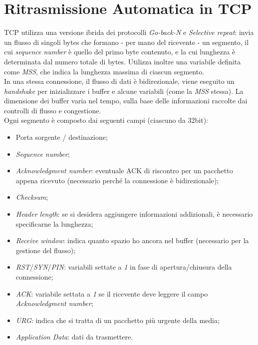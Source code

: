 \section{Ritrasmissione Automatica in TCP}
TCP utilizza una versione ibrida dei protocolli \textit{Go-back-N} e \textit{Selective repeat}: invia un flusso di singoli bytes che formano - per mano del ricevente - un segmento, il cui \textit{sequence number} è quello del primo byte contenuto, e la cui lunghezza è determinata dal numero totale di bytes. Utilizza inoltre una variabile definita come \textit{MSS}, che indica la lunghezza massima di ciascun segmento. \\
In una stessa connessione, il flusso di dati è bidirezionale, viene eseguito un \textit{handshake} per inizializzare i buffer e alcune variabili (come la \textit{MSS} stessa). La dimensione dei buffer varia nel tempo, sulla base delle informazioni raccolte dai controlli di flusso e congestione. \\
Ogni segmento è composto dai seguenti campi (ciascuno da 32bit):
\begin{itemize}
	\item Porta sorgente / destinazione;
	\item \textit{Sequence number};
	\item \textit{Acknowledgment number}: eventuale ACK di riscontro per un pacchetto appena ricevuto (necessario perché la connessione è bidirezionale);
	\item \textit{Checksum};
	\item \textit{Header length}: se si desidera aggiungere informazioni addizionali, è necessario specificarne la lunghezza;
	\item \textit{Receive window}: indica quanto spazio ho ancora nel buffer (necessario per la gestione del flusso);
	\item \textit{RST}/\textit{SYN}/\textit{PIN}: variabili settate a \textit{1} in fase di apertura/chiusura della connessione;
	\item \textit{ACK}: variabile settata a \textit{1} se il ricevente deve leggere il campo \textit{Acknowledgment number};
	\item \textit{URG}: indica che si tratta di un pacchetto più urgente della media;
	\item \textit{Application Data}: dati da trasmettere.
\end{itemize}